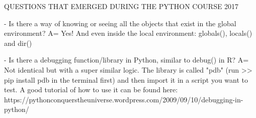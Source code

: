QUESTIONS THAT EMERGED DURING THE PYTHON COURSE 2017

- Is there a way of knowing or seeing all the objects that exist in the global environment?
A= Yes! And even inside the local environment: globals(), locals() and dir()

- Is there a debugging function/library in Python, similar to debug() in R?
A= Not identical but with a super similar logic. The library is called "pdb" (run >> pip install pdb in the terminal first) and then import it in a script you want to test. A good tutorial of how to use it can be found here: https://pythonconquerstheuniverse.wordpress.com/2009/09/10/debugging-in-python/
